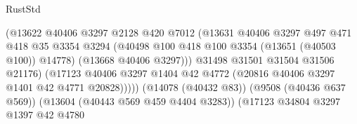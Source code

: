 \begin{lexlean}{RustStd}
\begin{coremodule}
                                                  (@13622
                                                    @40406
                                                    @3297
                                                    @2128
                                                    @420
                                                    @7012
                                                    (@13631
                                                      @40406
                                                      @3297
                                                      @497
                                                      @471
                                                      @418
                                                      @35
                                                      @3354
                                                      @3294
                                                      (@40498
                                                        @100
                                                        @418
                                                        @100
                                                        @3354
                                                        (@13651 (@40503 @100))
                                                        @14778)
                                                      (@13668 @40406 @3297)))
                                                  @31498
                                                  @31501
                                                  @31504
                                                  @31506
                                                  @21176)
                                                (@17123
                                                  @40406
                                                  @3297
                                                  @1404
                                                  @42
                                                  @4772
                                                  (@20816 @40406 @3297 @1401 @42 @4771 @20828)))))
                                          (@14078 (@40432 @83))
                                          (@9508 (@40436 @637 @569))
                                          (@13604 (@40443 @569 @459 @4404 @3283))
                                          (@17123
                                            @34804
                                            @3297
                                            @1397
                                            @42
                                            @4780

\end{coremodule}
\end{lexlean}
